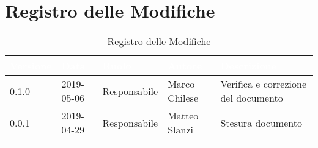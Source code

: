 \newpage

\section*{Registro delle Modifiche}

\begin{center}
\begin{longtable}[c]{|m{}|m{}|m{}|m{}|p{}|}
\hline
\rowcolor{bluelogo}\textbf{\textcolor{white}{Versione}} & \textbf{\textcolor{white}{Data}} & \textbf{\textcolor{white}{Ruolo}} & \textbf{\textcolor{white}{Autore}} & \textbf{\textcolor{white}{Descrizione}}\\
\hline \hline
\endfirsthead

\rowcolor{grigio} 0.1.0 & 2019-05-06 & Responsabile & Marco Chilese & Verifica e correzione del documento\\
\hline
0.0.1 & 2019-04-29 & Responsabile & Matteo Slanzi & Stesura documento \\
\hline
\caption{Registro delle Modifiche}
\end{longtable}
\end{center}
